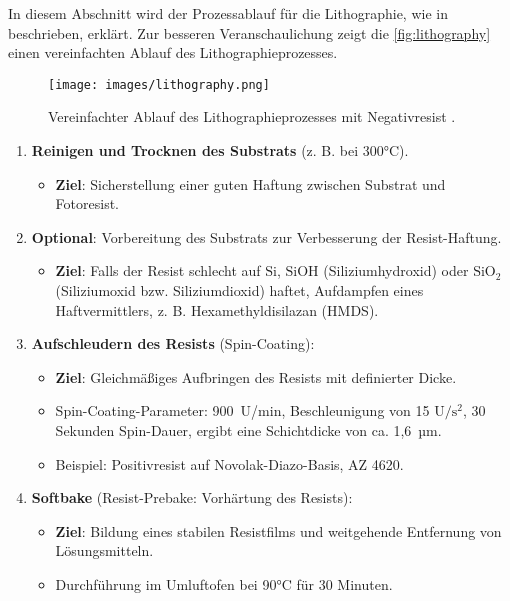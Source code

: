 \documentclass{article} %
\begin{document}
In diesem Abschnitt wird der Prozessablauf für die Lithographie, wie in \cite{schmid2024, gerald2006} beschrieben, erklärt. Zur besseren Veranschaulichung zeigt die \autoref{fig:lithography} einen vereinfachten Ablauf des Lithographieprozesses.

\begin{figure}[htb!]
    \centering
    \texttt{[image: images/lithography.png]} %
    \captionsetup{labelfont=bf, width=\textwidth} %
    \caption{Vereinfachter Ablauf des Lithographieprozesses mit Negativresist \cite{wias_photoresist}.}
    \label{fig:lithography}
\end{figure}

\begin{enumerate}
    \item \textbf{Reinigen und Trocknen des Substrats} (z. B. bei 300°C).
    \begin{itemize}
        \item \textbf{Ziel}: Sicherstellung einer guten Haftung zwischen Substrat und Fotoresist.
    \end{itemize}

    \item \textbf{Optional}: Vorbereitung des Substrats zur Verbesserung der Resist-Haftung.
    \begin{itemize}
        \item \textbf{Ziel}: Falls der Resist schlecht auf $\mathrm{Si}$, $\mathrm{SiOH}$ (Siliziumhydroxid) oder $\mathrm{SiO}_2$ (Siliziumoxid bzw. Siliziumdioxid) haftet, Aufdampfen eines Haftvermittlers, z. B. Hexamethyldisilazan (HMDS).
    \end{itemize}

    \item \textbf{Aufschleudern des Resists} (Spin-Coating):
    \begin{itemize}
        \item \textbf{Ziel}: Gleichmäßiges Aufbringen des Resists mit definierter Dicke.
        \item Spin-Coating-Parameter: 900~U/min, Beschleunigung von 15 $\mathrm{U}/\mathrm{s}^2$, 30 Sekunden Spin-Dauer, ergibt eine Schichtdicke von ca. 1,6~µm.
        \item Beispiel: Positivresist auf Novolak-Diazo-Basis, AZ 4620.
    \end{itemize}

    \item \textbf{Softbake} (Resist-Prebake: Vorhärtung des Resists):
    \begin{itemize}
        \item \textbf{Ziel}: Bildung eines stabilen Resistfilms und weitgehende Entfernung von Lösungsmitteln.
        \item Durchführung im Umluftofen bei 90°C für 30 Minuten.
    \end{itemize}


\end{enumerate}
\end{document}
